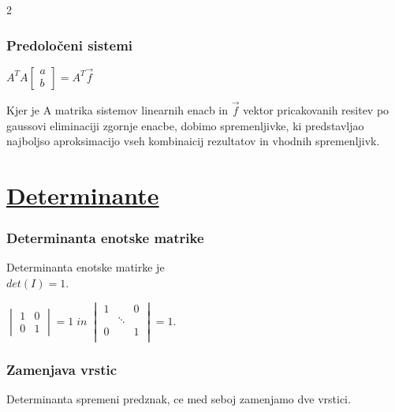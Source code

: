 \documentclass{article}
\begin{document}
\begin{multicols}{2}
	\subsubsection{Predoločeni sistemi}

	\begin{center}
		\begin{math}
			A^{T}A
			\begin{bmatrix}
				a \\
				b
			\end{bmatrix}
			= A^{T}\vec{f}
		\end{math}
	\end{center}
	Kjer je A matrika sistemov linearnih enacb in $\vec{f}$ vektor pricakovanih resitev
	po gaussovi eliminaciji zgornje enacbe, dobimo spremenljivke, ki predstavljao najboljso aproksimacijo vseh kombinaicij rezultatov in vhodnih spremenljivk.

	\section{\underline{Determinante}}

	\subsubsection{Determinanta enotske matrike}

	Determinanta enotske matirke je\\ $det(I) = 1$.
	\begin{center}
		\begin{math}
			\begin{vmatrix}
				1 & 0 \\
				0 & 1
			\end{vmatrix}
			= 1\; in\;
			\begin{vmatrix}
				1 &        & 0 \\
				  & \ddots &   \\
				0 &        & 1 \\
			\end{vmatrix}
			= 1.
		\end{math}
	\end{center}

	\subsubsection{Zamenjava vrstic}

	Determinanta spremeni predznak, ce med seboj zamenjamo dve vrstici.


\end{multicols}
\end{document}
